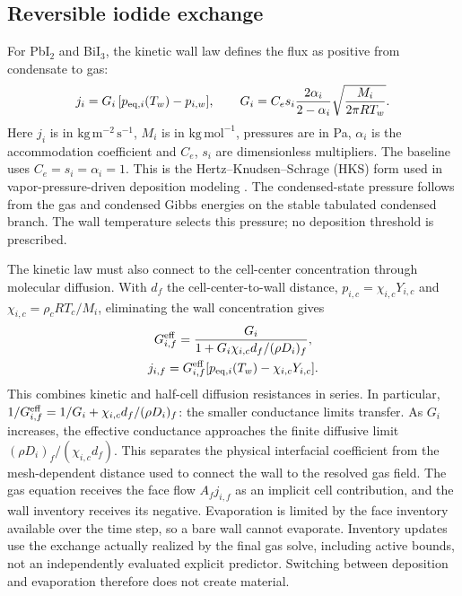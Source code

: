\subsection{Reversible iodide exchange}
\label{sec:wall}
For PbI$_2$ and BiI$_3$, the kinetic wall law defines the flux as
positive from condensate to gas:
\begin{equation}
 j_i=G_i\,[p_{{\rm eq},i}(T_w)-p_{i,w}],
 \qquad
 G_i=C_e s_i\frac{2\alpha_i}{2-\alpha_i}
       \sqrt{\frac{M_i}{2\pi RT_w}}.
 \label{eq:hks}
\end{equation}
Here $j_i$ is in $\mathrm{kg\,m^{-2}\,s^{-1}}$, $M_i$ is in
$\mathrm{kg\,mol^{-1}}$, pressures are in Pa, $\alpha_i$ is the
accommodation coefficient and $C_e$, $s_i$ are dimensionless
multipliers. The baseline uses $C_e=s_i=\alpha_i=1$.
This is the Hertz--Knudsen--Schrage (HKS) form
\cite{Hertz1882verdunstung,Knudsen1915maximale,Schrage1953theoretical}
used in vapor-pressure-driven deposition modeling
\cite{Lobresco2026assessment}. The condensed-state pressure follows from
the gas and condensed Gibbs energies on the stable tabulated condensed
branch. The wall temperature selects this pressure; no deposition
threshold is prescribed.

The kinetic law must also connect to the cell-center concentration
through molecular diffusion. With $d_f$ the cell-center-to-wall
distance, $p_{i,c}=\chi_{i,c}Y_{i,c}$ and
$\chi_{i,c}=\rho_cRT_c/M_i$, eliminating the wall concentration gives
\begin{equation}
 \begin{gathered}
 G_{i,f}^{\rm eff}=
 \frac{G_i}{1+G_i\chi_{i,c}d_f/(\rho D_i)_f},\\
 j_{i,f}=G_{i,f}^{\rm eff}
 [p_{{\rm eq},i}(T_w)-\chi_{i,c}Y_{i,c}].
 \end{gathered}
 \label{eq:halfcell}
\end{equation}
This combines kinetic and half-cell diffusion resistances in series.
In particular, $1/G_{i,f}^{\rm eff}=1/G_i+
\chi_{i,c}d_f/(\rho D_i)_f$: the smaller conductance limits transfer.
As $G_i$ increases, the effective conductance approaches the finite
diffusive limit $(\rho D_i)_f/(\chi_{i,c}d_f)$. This separates the
physical interfacial coefficient from the mesh-dependent distance used
to connect the wall to the resolved gas field.
The gas equation receives the face flow $A_f j_{i,f}$ as an implicit
cell contribution, and the wall inventory receives its negative.
Evaporation is limited by the face inventory available over the time
step, so a bare wall cannot evaporate. Inventory updates use the
exchange actually realized by the final gas solve, including active
bounds, not an independently evaluated explicit predictor. Switching
between deposition and evaporation therefore does not create material.


